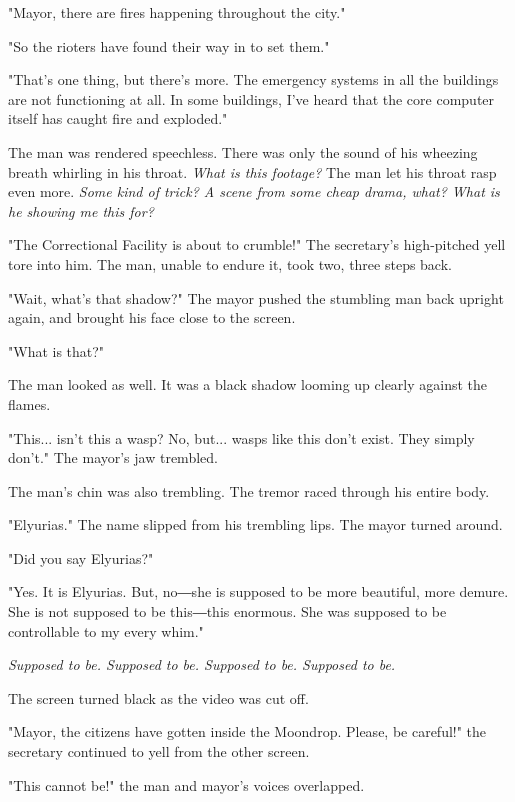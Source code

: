 "Mayor, there are fires happening throughout the city."

"So the rioters have found their way in to set them."

"That's one thing, but there's more. The emergency systems in all the
buildings are not functioning at all. In some buildings, I've heard that
the core computer itself has caught fire and exploded."

The man was rendered speechless. There was only the sound of his
wheezing breath whirling in his throat. \emph{What is this footage?} The man
let his throat rasp even more. \emph{Some kind of trick? A scene from some
cheap drama, what? What is he showing me this for?}

"The Correctional Facility is about to crumble!" The secretary's
high-pitched yell tore into him. The man, unable to endure it, took two,
three steps back.

"Wait, what's that shadow?" The mayor pushed the stumbling man back
upright again, and brought his face close to the screen.

"What is that?"

The man looked as well. It was a black shadow looming up clearly against
the flames.

"This... isn't this a wasp? No, but... wasps like this don't exist. They
simply don't." The mayor's jaw trembled.

The man's chin was also trembling. The tremor raced through his entire
body.

"Elyurias." The name slipped from his trembling lips. The mayor turned
around.

"Did you say Elyurias?"

"Yes. It is Elyurias. But, no―she is supposed to be more beautiful, more
demure. She is not supposed to be this―this enormous. She was supposed
to be controllable to my every whim."

\emph{Supposed to be. Supposed to be. Supposed to be. Supposed to be.}

The screen turned black as the video was cut off.

"Mayor, the citizens have gotten inside the Moondrop. Please, be
careful!" the secretary continued to yell from the other screen.

"This cannot be!" the man and mayor's voices overlapped.